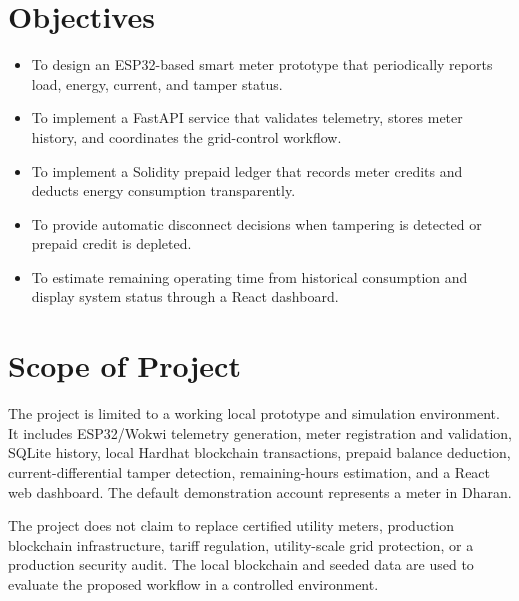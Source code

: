 \section{Objectives}
\begin{itemize}
  \item To design an ESP32-based smart meter prototype that periodically reports load, energy, current, and tamper status.
  \item To implement a FastAPI service that validates telemetry, stores meter history, and coordinates the grid-control workflow.
  \item To implement a Solidity prepaid ledger that records meter credits and deducts energy consumption transparently.
  \item To provide automatic disconnect decisions when tampering is detected or prepaid credit is depleted.
  \item To estimate remaining operating time from historical consumption and display system status through a React dashboard.
\end{itemize}


\section{Scope of Project}
The project is limited to a working local prototype and simulation environment. It includes ESP32/Wokwi telemetry generation, meter registration and validation, SQLite history, local Hardhat blockchain transactions, prepaid balance deduction, current-differential tamper detection, remaining-hours estimation, and a React web dashboard. The default demonstration account represents a meter in Dharan.

The project does not claim to replace certified utility meters, production blockchain infrastructure, tariff regulation, utility-scale grid protection, or a production security audit. The local blockchain and seeded data are used to evaluate the proposed workflow in a controlled environment.
